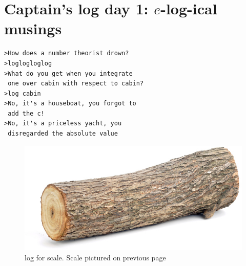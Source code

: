 \documentclass[12pt,a4paper]{amsart}
\theoremstyle{definition}
\theoremstyle{remark}
\begin{document}
\section*{Captain's log day 1: $e$-log-ical musings}
\begin{verbatim}
>How does a number theorist drown?
>loglogloglog
>What do you get when you integrate 
 one over cabin with respect to cabin?
>log cabin
>No, it's a houseboat, you forgot to 
 add the c!
>No, it's a priceless yacht, you 
 disregarded the absolute value
\end{verbatim}
\setcounter{section}{6}
\begin{center}
  \begin{figure}[ht]
    \includegraphics[width=.57\linewidth]{log.png}
    \caption{log for scale. Scale pictured on previous page}
  \end{figure}
\end{center}
\newpage
\end{document}
